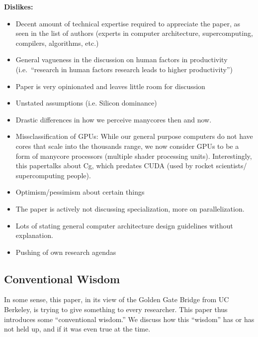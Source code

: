 \noindent \textbf{Dislikes:}

\begin{itemize}
    \item Decent amount of technical expertise required to appreciate the paper, as seen in the list of authors (experts in computer architecture, supercomputing, compilers, algorithms, etc.)
    \item General vagueness in the discussion on human factors in productivity (i.e.\ ``research in human factors research leads to higher productivity'')
    \item Paper is very opinionated and leaves little room for discussion
    \item Unstated assumptions (i.e. Silicon dominance)
    \item Drastic differences in how we perceive manycores then and now.
    \item Missclassification of GPUs: While our general purpose computers do not have cores that scale into the thousands range, we now consider GPUs to be a form of manycore processors (multiple shader processing units). Interestingly, this papertalks about Cg, which predates CUDA (used by rocket scientists/ supercomputing people).
    \item Optimism/pessimism about certain things
    \item The paper is actively not discussing specialization, more on parallelization.
    \item Lots of stating general computer architecture design guidelines without explanation.
    \item Pushing of own research agendas

\end{itemize}

\subsection{Conventional Wisdom}\label{feb-11:a-view:conventional}
In some sense, this paper, in its view of the Golden Gate Bridge from UC Berkeley, is trying to give something to every researcher.
This paper thus introduces some ``conventional wisdom.''
We discuss how this ``wisdom'' has or has not held up, and if it was even true at the time.


